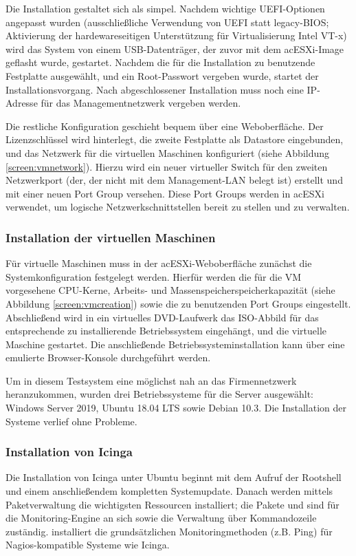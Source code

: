 Die Installation gestaltet sich als simpel. Nachdem wichtige UEFI-Optionen angepasst wurden (ausschließliche Verwendung von UEFI statt legacy-BIOS; Aktivierung der hardewareseitigen Unterstützung für Virtualisierung \glqq{}Intel VT-x\grqq{}) wird das System von einem USB-Datenträger, der zuvor mit dem ac{ESXi}-Image geflasht wurde, gestartet. Nachdem die für die Installation zu benutzende Festplatte ausgewählt, und ein Root-Passwort vergeben wurde, startet der Installationsvorgang. Nach abgeschlossener Installation muss noch eine IP-Adresse für das Managementnetzwerk vergeben werden.

Die restliche Konfiguration geschieht bequem über eine Weboberfläche. Der Lizenzschlüssel wird hinterlegt, die zweite Festplatte als Datastore eingebunden, und das Netzwerk für die virtuellen Maschinen konfiguriert (siehe Abbildung \ref{screen:vmnetwork}). Hierzu wird ein neuer virtueller Switch für den zweiten Netzwerkport (der, der nicht mit dem Management-\ac{LAN} belegt ist) erstellt und mit einer neuen Port Group versehen. Diese Port Groups werden in ac{ESXi} verwendet, um logische Netzwerkschnittstellen bereit zu stellen und zu verwalten. 

\subsubsection{Installation der virtuellen Maschinen}
\label{sec:InstallationVMs}
Für virtuelle Maschinen muss in der ac{ESXi}-Weboberfläche zunächst die Systemkonfiguration festgelegt werden. Hierfür werden die für die \ac{VM} vorgesehene \ac{CPU}-Kerne, Arbeits- und Massenspeicherspeicherkapazität (siehe Abbildung \ref{screen:vmcreation}) sowie die zu benutzenden Port Groups eingestellt. Abschließend wird in ein virtuelles DVD-Laufwerk das ISO-Abbild für das entsprechende zu installierende Betriebssystem eingehängt, und die virtuelle Maschine gestartet. Die anschließende Betriebssysteminstallation kann über eine emulierte Browser-Konsole durchgeführt werden.

Um in diesem Testsystem eine möglichst nah an das Firmennetzwerk heranzukommen, wurden drei Betriebssysteme für die Server ausgewählt: Windows Server 2019, Ubuntu 18.04 LTS sowie Debian 10.3. Die Installation der Systeme verlief ohne Probleme.

\subsubsection{Installation von \glqq{}Icinga\grqq{}}
\label{sec:InstallationIcinga}
Die Installation von \glqq{}Icinga\grqq{} unter Ubuntu beginnt mit dem Aufruf der Rootshell und einem anschließendem kompletten Systemupdate. Danach werden mittels Paketverwaltung die wichtigsten Ressourcen installiert; die Pakete  und  sind für die Monitoring-Engine an sich sowie die Verwaltung über Kommandozeile zuständig.  installiert die grundsätzlichen Monitoringmethoden (z.B. Ping) für Nagios-kompatible Systeme wie \glqq{}Icinga\grqq{}.

